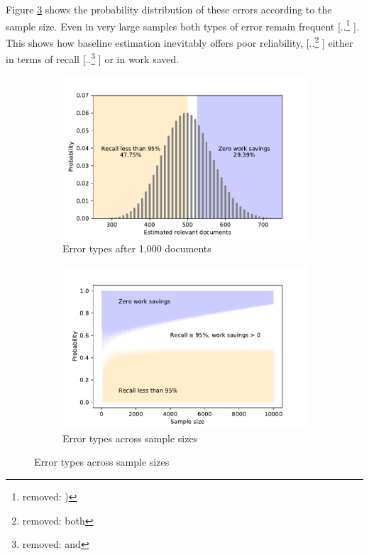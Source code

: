\documentclass{bmcart}
\providecommand{\DIFadd}[1]{{\protect\color{blue} \sf #1}} %
\providecommand{\DIFdel}[1]{{\protect\color{red} [..\footnote{removed: #1} ]}} %
\providecommand{\DIFaddbegin}{} %
\providecommand{\DIFaddend}{} %
\providecommand{\DIFdelbegin}{} %
\providecommand{\DIFdelend}{} %
\providecommand{\DIFaddbeginFL}{} %
\providecommand{\DIFaddendFL}{} %
\providecommand{\DIFdelbeginFL}{} %
\providecommand{\DIFdelendFL}{} %
\newcommand{\DIFscaledelfig}{0.5}
\newlength{\DIFdelgraphicswidth} %
\newlength{\DIFdelgraphicsheight} %
\newcommand{\DIFaddincludegraphics}[2][]{{\color{blue}\fbox{\DIFOincludegraphics[#1]{#2}}}} %
\newcommand{\DIFdelincludegraphics}[2][]{%
\sbox{\DIFdelgraphicsbox}{\DIFOincludegraphics[#1]{#2}}%
\settoboxwidth{\DIFdelgraphicswidth}{\DIFdelgraphicsbox} %
\settoboxtotalheight{\DIFdelgraphicsheight}{\DIFdelgraphicsbox} %
\scalebox{\DIFscaledelfig}{%
\parbox[b]{\DIFdelgraphicswidth}{\usebox{\DIFdelgraphicsbox}\\[-\baselineskip] \rule{\DIFdelgraphicswidth}{0em}}\llap{\resizebox{\DIFdelgraphicswidth}{\DIFdelgraphicsheight}{%
\setlength{\unitlength}{\DIFdelgraphicswidth}%
\begin{picture}(1,1)%
\thicklines\linethickness{2pt} %
{\color[rgb]{1,0,0}\put(0,0){\framebox(1,1){}}}%
{\color[rgb]{1,0,0}\put(0,0){\line( 1,1){1}}}%
{\color[rgb]{1,0,0}\put(0,1){\line(1,-1){1}}}%
\end{picture}%
}\hspace*{3pt}}} %
} %
\DeclareRobustCommand{\DIFaddbegin}{\DIFOaddbegin \let\includegraphics\DIFaddincludegraphics} %
\DeclareRobustCommand{\DIFaddend}{\DIFOaddend \let\includegraphics\DIFOincludegraphics} %
\DeclareRobustCommand{\DIFdelbegin}{\DIFOdelbegin \let\includegraphics\DIFdelincludegraphics} %
\DeclareRobustCommand{\DIFdelend}{\DIFOaddend \let\includegraphics\DIFOincludegraphics} %
\DeclareRobustCommand{\DIFaddbeginFL}{\DIFOaddbeginFL \let\includegraphics\DIFaddincludegraphics} %
\DeclareRobustCommand{\DIFaddendFL}{\DIFOaddendFL \let\includegraphics\DIFOincludegraphics} %
\DeclareRobustCommand{\DIFdelbeginFL}{\DIFOdelbeginFL \let\includegraphics\DIFdelincludegraphics} %
\DeclareRobustCommand{\DIFdelendFL}{\DIFOaddendFL \let\includegraphics\DIFOincludegraphics} %
\begin{document}
	Figure \ref{fig:bir_error_distribution} shows the probability distribution of these errors according to the sample size. Even in very large samples both types of error remain frequent\DIFdelbegin \DIFdel{)}\DIFdelend .
	This shows how baseline estimation inevitably offers poor reliability, \DIFdelbegin \DIFdel{both }\DIFdelend \DIFaddbegin \DIFadd{either }\DIFaddend in terms of recall \DIFdelbegin \DIFdel{and }\DIFdelend \DIFaddbegin \DIFadd{or }\DIFaddend in work saved.

	\begin{figure}
		\centering
		\begin{subfigure}[b]{0.475\textwidth}   
			\centering 
			\DIFdelbeginFL %
\DIFdelendFL \DIFaddbeginFL \includegraphics[width=\textwidth]{2_figs_bir_errors.pdf}
			\DIFaddendFL \caption[]%
			{{\small Error types after 1,000 documents \\}}    
			\label{fig:bir_error}
		\end{subfigure}
		\hfill
		\begin{subfigure}[b]{0.475\textwidth}   
			\centering 
			\DIFdelbeginFL %
\DIFdelendFL \DIFaddbeginFL \includegraphics[width=\textwidth]{2_figs_bir_error_distribution.pdf}
			\DIFaddendFL \caption[]%
			{{\footnotesize Error types across sample sizes}}    
			\label{fig:bir_error_distribution}
		\end{subfigure}


\end{figure}
\end{document}
